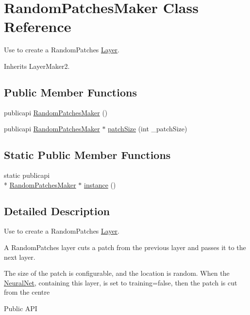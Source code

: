 \hypertarget{classRandomPatchesMaker}{\section{Random\-Patches\-Maker Class Reference}
\label{classRandomPatchesMaker}
}


Use to create a Random\-Patches \hyperlink{classLayer}{Layer}.  




Inherits Layer\-Maker2.

\subsection*{Public Member Functions}
\begin{DoxyCompactItemize}
\item 
publicapi \hyperlink{classRandomPatchesMaker_ab97dbb34dfa2a30f1b6ef64c43325191}{Random\-Patches\-Maker} ()
\item 
publicapi \hyperlink{classRandomPatchesMaker}{Random\-Patches\-Maker} $\ast$ \hyperlink{classRandomPatchesMaker_a5b9fca22c71b70d275c80b4e41d819b6}{patch\-Size} (int \-\_\-patch\-Size)
\end{DoxyCompactItemize}
\subsection*{Static Public Member Functions}
\begin{DoxyCompactItemize}
\item 
static publicapi \\*
\hyperlink{classRandomPatchesMaker}{Random\-Patches\-Maker} $\ast$ \hyperlink{classRandomPatchesMaker_ad92cc08bc586e7ab9a88f22b422c5787}{instance} ()
\end{DoxyCompactItemize}


\subsection{Detailed Description}
Use to create a Random\-Patches \hyperlink{classLayer}{Layer}. 

A Random\-Patches layer cuts a patch from the previous layer and passes it to the next layer.

The size of the patch is configurable, and the location is random. When the \hyperlink{classNeuralNet}{Neural\-Net}, containing this layer, is set to training=false, then the patch is cut from the centre \begin{DoxyParagraph}{Public A\-P\-I}

\end{DoxyParagraph}


